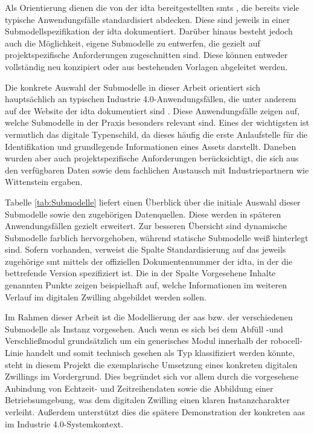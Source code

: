 Als Orientierung dienen die von der \acs{idta} bereitgestellten \acsp{smt} \cite{idtaTemplates}, die bereits viele typische Anwendungsfälle standardisiert abdecken.
Diese sind jeweils in einer Submodellspezifikation der \acs{idta} dokumentiert.
Darüber hinaus besteht jedoch auch die Möglichkeit, eigene Submodelle zu entwerfen, die gezielt auf projektspezifische Anforderungen zugeschnitten sind.
Diese können entweder vollständig neu konzipiert oder aus bestehenden Vorlagen abgeleitet werden.

Die konkrete Auswahl der Submodelle in dieser Arbeit orientiert sich hauptsächlich an typischen Industrie 4.0-Anwendungsfällen, die unter anderem auf der Website der \acs{idta} dokumentiert sind \cite{idtaUseCases}.
Diese Anwendungsfälle zeigen auf, welche Submodelle in der Praxis besonders relevant sind.
Eines der wichtigsten ist vermutlich das digitale Typenschild, da dieses häufig die erste Anlaufstelle für die Identifikation und grundlegende Informationen eines Assets darstellt.
Daneben wurden aber auch projektspezifische Anforderungen berücksichtigt, die sich aus den verfügbaren Daten sowie dem fachlichen Austausch mit Industriepartnern wie Wittenstein ergaben.

Tabelle \ref{tab:Submodelle} liefert einen Überblick über die initiale Auswahl dieser Submodelle sowie den zugehörigen Datenquellen.
Diese werden in späteren Anwendungsfällen gezielt erweitert.
Zur besseren Übersicht sind dynamische Submodelle farblich hervorgehoben, während statische Submodelle weiß hinterlegt sind.
Sofern vorhanden, verweist die Spalte Standardisierung auf das jeweils zugehörige \acs{smt} mittels der offiziellen Dokumentennummer der \acs{idta}, in der die bettrefende Version spezifiziert ist.
Die in der Spalte Vorgesehene Inhalte genannten Punkte zeigen beispielhaft auf, welche Informationen im weiteren Verlauf im digitalen Zwilling abgebildet werden sollen.



Im Rahmen dieser Arbeit ist die Modellierung der \acs{aas} bzw. der verschiedenen Submodelle als Instanz vorgesehen.
Auch wenn es sich bei dem Abfüll -und Verschließmodul grundsätzlich um ein generisches Modul innerhalb der robocell-Linie handelt und somit technisch gesehen als Typ klassifiziert werden könnte, steht in diesem Projekt die exemplarische Umsetzung eines konkreten digitalen Zwillings im Vordergrund.
Dies begründet sich vor allem durch die vorgesehene Anbindung von Echtzeit- und Zeitreihendaten sowie die Abbildung einer Betriebsumgebung, was dem digitalen Zwilling einen klaren Instanzcharakter verleiht.
Außerdem unterstützt dies die spätere Demonstration der konkreten \acs{aas} im Industrie 4.0-Systemkontext.


